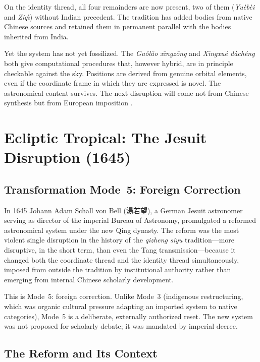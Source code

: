 \documentclass[10pt,a4paper]{article}
\newcommand{\zh}[1]{#1}
\begin{document}
On the identity thread, all four remainders are now present, two of
them (\textit{Yu\`eb\`ei} and \textit{Ziq\`{\i}}) without Indian precedent.  The
tradition has added bodies from native Chinese sources and retained
them in permanent parallel with the bodies inherited from India.

Yet the system has not yet fossilized.  The \textit{Gu\v{o}l\v{a}o x\={\i}ngz\={o}ng} and
\textit{X\={\i}ngxu\'e d\`ach\'eng} both give computational procedures that, however
hybrid, are in principle checkable against the sky.  Positions are
derived from genuine orbital elements, even if the coordinate frame
in which they are expressed is novel.  The astronomical content
survives.  The next disruption will come not from Chinese synthesis
but from European imposition \cite{mak2014pseudoplanets,niu2010fourremains}.

\section{Ecliptic Tropical: The Jesuit Disruption (1645)}
\label{sec:jesuit}

\subsection*{Transformation Mode~5: Foreign Correction}

In 1645 Johann Adam Schall von Bell (\zh{湯若望}), a German Jesuit
astronomer serving as director of the imperial Bureau of Astronomy,
promulgated a reformed astronomical system under the new Qing dynasty.
The reform was the most violent single disruption in the history of
the \textit{qizheng siyu} tradition---more disruptive, in the short term,
than even the Tang transmission---because it changed both the
coordinate thread and the identity thread simultaneously, imposed
from outside the tradition by institutional authority rather than
emerging from internal Chinese scholarly development.

This is Mode~5: foreign correction.  Unlike Mode~3 (indigenous
restructuring, which was organic cultural pressure adapting an
imported system to native categories), Mode~5 is a deliberate,
externally authorized reset.  The new system was not proposed for
scholarly debate; it was mandated by imperial decree.

\subsection*{The Reform and Its Context}
\end{document}
